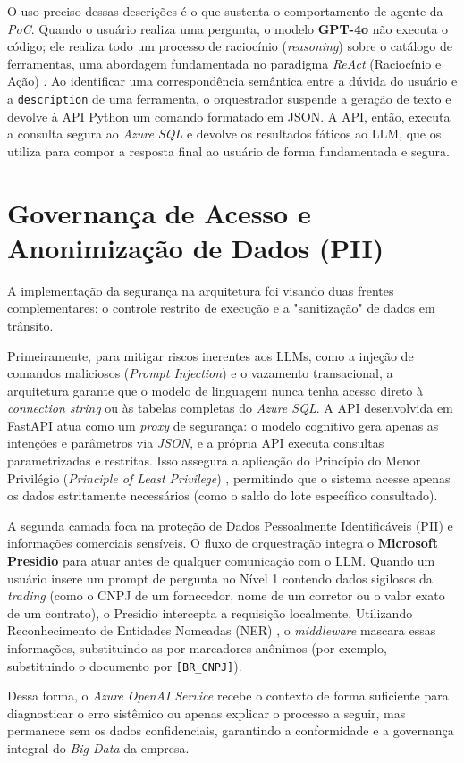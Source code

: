 O uso preciso dessas descrições é o que sustenta o comportamento de agente da \textit{PoC}. Quando o usuário realiza uma pergunta, o modelo \textbf{GPT-4o} não executa o código; ele realiza todo um processo de raciocínio (\textit{reasoning}) sobre o catálogo de ferramentas, uma abordagem fundamentada no paradigma \textit{ReAct} (Raciocínio e Ação) \cite{yao2022react}. Ao identificar uma correspondência semântica entre a dúvida do usuário e a \texttt{description} de uma ferramenta, o orquestrador suspende a geração de texto e devolve à API Python um comando formatado em JSON. A API, então, executa a consulta segura ao \textit{Azure SQL} e devolve os resultados fáticos ao LLM, que os utiliza para compor a resposta final ao usuário de forma fundamentada e segura.

\section{Governança de Acesso e Anonimização de Dados (PII)}

A implementação da segurança na arquitetura foi visando duas frentes complementares: o controle restrito de execução e a "sanitização" de dados em trânsito.

Primeiramente, para mitigar riscos inerentes aos LLMs, como a injeção de comandos maliciosos (\textit{Prompt Injection}) \cite{owasp2023llm} e o vazamento transacional, a arquitetura garante que o modelo de linguagem nunca tenha acesso direto à \textit{connection string} ou às tabelas completas do \textit{Azure SQL}. A API desenvolvida em FastAPI atua como um \textit{proxy} de segurança: o modelo cognitivo gera apenas as intenções e parâmetros via \textit{JSON}, e a própria API executa consultas parametrizadas e restritas. Isso assegura a aplicação do Princípio do Menor Privilégio (\textit{Principle of Least Privilege}) \cite{saltzer1975protection}, permitindo que o sistema acesse apenas os dados estritamente necessários (como o saldo do lote específico consultado).

A segunda camada foca na proteção de Dados Pessoalmente Identificáveis (PII) e informações comerciais sensíveis. O fluxo de orquestração integra o \textbf{Microsoft Presidio} para atuar antes de qualquer comunicação com o LLM. Quando um usuário insere um prompt de pergunta no Nível 1 contendo dados sigilosos da \textit{trading} (como o CNPJ de um fornecedor, nome de um corretor ou o valor exato de um contrato), o Presidio intercepta a requisição localmente. Utilizando Reconhecimento de Entidades Nomeadas (NER) \cite{jurafsky2023speech}, o \textit{middleware} mascara essas informações, substituindo-as por marcadores anônimos (por exemplo, substituindo o documento por \texttt{[BR\_CNPJ]}). 

Dessa forma, o \textit{Azure OpenAI Service} recebe o contexto de forma suficiente para diagnosticar o erro sistêmico ou apenas explicar o processo a seguir, mas permanece sem os dados confidenciais, garantindo a conformidade e a governança integral do \textit{Big Data} da empresa.